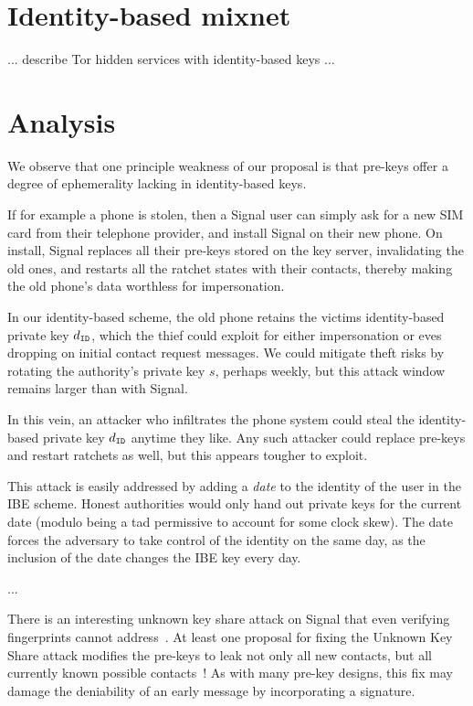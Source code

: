 \documentclass[twoside,letterpaper]{sig-alternate}
\begin{document}
\section{Identity-based mixnet} %

... describe Tor hidden services with identity-based keys ...


\section{Analysis}

We observe that one principle weakness of our proposal is that pre-keys
offer a degree of ephemerality lacking in identity-based keys.

If for example a phone is stolen, then a Signal user can simply ask
for a new SIM card from their telephone provider, and install Signal
on their new phone.  On install, Signal replaces all their pre-keys
stored on the key server, invalidating the old ones, and restarts all
the ratchet states with their contacts, thereby making the old phone's
data worthless for impersonation.

In our identity-based scheme, the old phone retains the victims
identity-based private key $d_{\mathtt{ID}}$, which the thief could exploit for
either impersonation or eves dropping on initial contact request messages.
We could mitigate theft risks by rotating the authority's private key $s$,
perhaps weekly, but this attack window remains larger than with Signal.

In this vein, an attacker who infiltrates the phone system could steal
the identity-based private key $d_{\mathtt{ID}}$ anytime they like.
Any such attacker could replace pre-keys and restart ratchets as well,
but this appears tougher to exploit.

This attack is easily addressed by adding a {\em date} to the
identity of the user in the IBE scheme.  Honest authorities would
only hand out private keys for the current date (modulo being
a tad permissive to account for some clock skew).  The date forces
the adversary to take control of the identity on the same day, as
the inclusion of the date changes the IBE key every day.

\smallskip


\smallskip

...

There is an interesting unknown key share attack on Signal that
even verifying fingerprints cannot address~\cite[\S4.2]{TextSecure}.
At least one proposal for fixing the Unknown Key Share attack
modifies the pre-keys to leak not only all new contacts, but
all currently known possible contacts~\cite[\S4.3]{TextSecure}!
As with many pre-key designs, this fix may damage the deniability
 of an early message by incorporating a signature.
\end{document}
